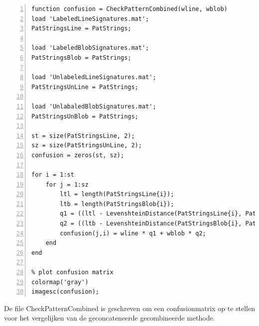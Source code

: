 \documentclass[a4paper]{article}
\begin{document}
\begin{lstlisting}[caption= CheckPatternCombined.m, label=lst:checkcombined, numbers=left]
function confusion = CheckPatternCombined(wline, wblob)
load 'LabeledLineSignatures.mat';
PatStringsLine = PatStrings;

load 'LabeledBlobSignatures.mat';
PatStringsBlob = PatStrings;

load 'UnlabeledLineSignatures.mat';
PatStringsUnLine = PatStrings;

load 'UnlabaledBlobSignatures.mat';
PatStringsUnBlob = PatStrings;

st = size(PatStringsLine, 2);   
sz = size(PatStringsUnLine, 2);
confusion = zeros(st, sz);

for i = 1:st
	for j = 1:sz
        ltl = length(PatStringsLine{i});
        ltb = length(PatStringsBlob{i});
        q1 = ((ltl - LevenshteinDistance(PatStringsLine{i}, PatStringsUnLine{j})) / ltl) * 100;
        q2 = ((ltb - LevenshteinDistance(PatStringsBlob{i}, PatStringsUnBlob{j})) / ltb) * 100;
        confusion(j,i) = wline * q1 + wblob * q2;
	end
end

% plot confusion matrix
colormap('gray')
imagesc(confusion);
\end{lstlisting}
De file CheckPatternCombined is geschreven om een confusionmatrix op te stellen voor het vergelijken van de geconcateneerde gecombineerde methode.
\end{document}
